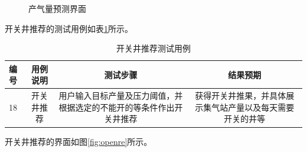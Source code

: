 \begin{figure}
    \centering
    \hfil
    \caption{产气量预测界面}
    \label{fig:prere}
\end{figure}

开关井推荐的测试用例如表\ref{tab:opente}所示。

\begin{table}[H]
    \renewcommand{\arraystretch}{1.5}
    \centering
    \caption{开关井推荐测试用例}
    \label{tab:opente}
    \begin{tabular}{|l|c|c|c|}
        \hline
        编号 & 用例说明 &测试步骤 &结果预期 \\
        \hline
        18 & 开关井推荐 & 用户输入目标产量及压力阈值，并根据选定的不能开的等条件作出开关井推荐 & 获得开关井推果，并具体展示集气站产量以及每天需要开关的井等 \\
        \hline
    \end{tabular}
\end{table}

开关井推荐的界面如图\ref{fig:openre}所示。

